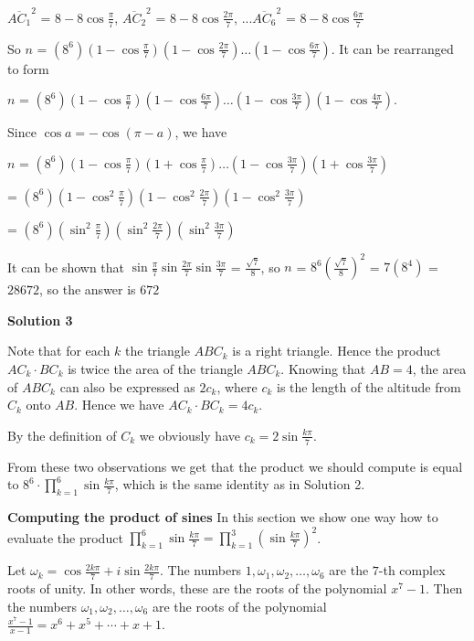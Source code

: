 \begin{enumerate}
 $\overline {AC_1}^2$ = $8 - 8 \cos \frac {\pi}{7}$,   $\overline {AC_2}^2$ = $8 - 8 \cos \frac {2\pi}{7}$, ...$\overline {AC_6}^2$ = $8 - 8 \cos \frac {6\pi}{7}$ 

 So $n$ = $(8^6)(1 - \cos \frac {\pi}{7})(1 - \cos \frac {2\pi}{7})\dots(1 - \cos \frac{6\pi}{7})$. It can be rearranged to form

 $n$ = $(8^6)(1 - \cos \frac {\pi}{7})(1 - \cos \frac {6\pi}{7})\dots(1 - \cos \frac {3\pi}{7})(1 - \cos \frac {4\pi}{7})$. 

 Since $\cos a = - \cos (\pi - a)$, we have

 $n$ = $(8^6)(1 - \cos \frac {\pi}{7})(1 + \cos \frac {\pi}{7}) \dots (1 - \cos \frac {3\pi}{7})(1 + \cos \frac {3\pi}{7})$

 = $(8^6)(1 - \cos^2 \frac {\pi}{7})(1 - \cos^2 \frac {2\pi}{7})(1 - \cos^2 \frac {3\pi}{7})$

 = $(8^6)(\sin^2 \frac {\pi}{7})(\sin^2 \frac {2\pi}{7})(\sin^2 \frac {3\pi}{7})$

 It can be shown that $\sin \frac {\pi}{7} \sin \frac {2\pi}{7} \sin \frac {3\pi}{7}$ = $\frac {\sqrt {7}}{8}$, so $n$ = $8^6(\frac {\sqrt {7}}{8})^2$ = $7(8^4)$ = $28672$, so the answer is $\boxed {672}$




\textbf{Solution 3}

Note that for each $k$ the triangle $ABC_k$ is a right triangle. Hence the product $AC_k \cdot BC_k$ is twice the area of the triangle $ABC_k$. Knowing that $AB=4$, the area of $ABC_k$ can also be expressed as $2c_k$, where $c_k$ is the length of the altitude from $C_k$ onto $AB$. Hence we have $AC_k \cdot BC_k = 4c_k$.

 By the definition of $C_k$ we obviously have $c_k = 2\sin\frac{k\pi}7$. 

 From these two observations we get that the product we should compute is equal to $8^6 \cdot \prod_{k=1}^6 \sin \frac{k\pi}7$, which is the same identity as in Solution 2.

 \textbf{Computing the product of sines} In this section we show one way how to evaluate the product $\prod_{k=1}^6 \sin \frac{k\pi}7 = \prod_{k=1}^3 (\sin \frac{k\pi}7)^2$.

 Let $\omega_k = \cos \frac{2k\pi}7 + i\sin \frac{2k\pi}7$. The numbers $1,\omega_1,\omega_2,\dots,\omega_6$ are the $7$-th complex roots of unity. In other words, these are the roots of the polynomial $x^7-1$. Then the numbers $\omega_1,\omega_2,\dots,\omega_6$ are the roots of the polynomial $\frac{x^7-1}{x-1} = x^6+x^5+\cdots+x+1$.


\end{enumerate}
